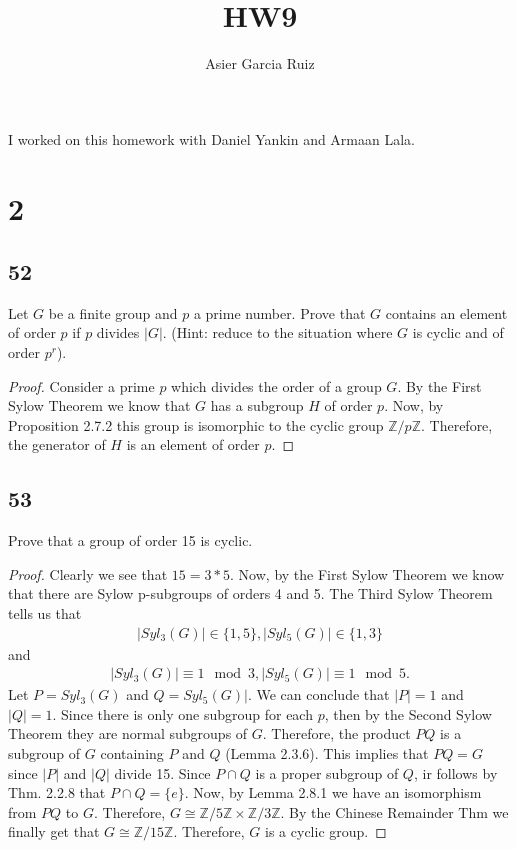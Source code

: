 \documentclass{article}
\title{HW9}
\author{Asier Garcia Ruiz}
\newcommand{\Z}{\mathbb{Z}}
\newcommand{\ZmodnZ}[1]{\Z / #1 \Z}
\newenvironment{hwproof}[1]
{
    #1
    \begin{proof}
}{
    \end{proof}
}
\begin{document}
\maketitle

I worked on this homework with Daniel Yankin and Armaan Lala.
\section*{2}
\subsection*{52}
\begin{hwproof}
    {
        Let $G$ be a finite group and $p$ a prime number. Prove that $G$ contains
        an element of order $p$ if $p$ divides $|G|$. (Hint: reduce to the
        situation where $G$ is cyclic and of order $p^r$).
    }
    Consider a prime $p$ which divides the order of a group $G$. By the First Sylow
    Theorem we know that $G$ has a subgroup $H$ of order $p$. Now, by Proposition
    2.7.2 this group is isomorphic to the cyclic group $\ZmodnZ{p}$. Therefore,
    the generator of $H$ is an element of order $p$.
\end{hwproof}

\subsection*{53}
\begin{hwproof}
    {
        Prove that a group of order 15 is cyclic.
    }
    Clearly we see that $15=3*5$. Now, by the First Sylow Theorem we know
    that there are Sylow p-subgroups of orders 4 and 5. The Third Sylow Theorem
    tells us that
    \begin{gather*}
        |Syl_3(G)| \in \{1, 5\},
        |Syl_5(G)| \in \{1, 3\}
    \end{gather*}
    and
    \begin{gather*}
        |Syl_3(G)| \equiv 1 \mod 3,
        |Syl_5(G)| \equiv 1 \mod 5.
    \end{gather*}
    Let $P = Syl_3(G)$ and $Q = Syl_5(G)|$.
    We can conclude that $|P| = 1$ and $|Q| = 1$. Since there is
    only one subgroup for each $p$, then by the Second Sylow Theorem they are
    normal subgroups of $G$. Therefore, the product $PQ$ is a subgroup of
    $G$ containing $P$ and $Q$ (Lemma 2.3.6). This implies that
    $PQ = G$ since $|P|$ and $|Q|$ divide 15. Since $P \cap Q$ is a proper
    subgroup of $Q$, ir follows by Thm. 2.2.8 that $P\cap Q = \{e\}$.
    Now, by Lemma 2.8.1 we have an isomorphism from $PQ$ to $G$.
    Therefore, $G \cong \ZmodnZ{5} \times \ZmodnZ{3}$. By the Chinese Remainder
    Thm we finally get that $G \cong \ZmodnZ{15}$. Therefore, $G$ is a
    cyclic group.

\end{hwproof}
\end{document}
